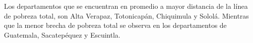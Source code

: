 Los departamentos que se encuentran en promedio a mayor distancia de la línea de pobreza total, son  Alta Verapaz, Totonicapán, Chiquimula y Sololá. Mientras que la menor brecha de pobreza total se observa en los departamentos de Guatemala, Sacatepéquez y Escuintla. 